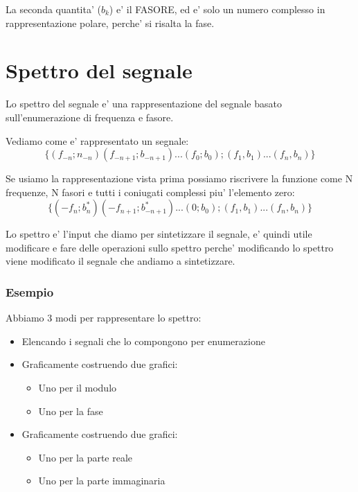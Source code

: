 La seconda quantita' ($b_k$) e' il FASORE, ed e' solo un numero complesso in rappresentazione polare, perche' si risalta la fase.

\section{Spettro del segnale}
Lo spettro del segnale e' una rappresentazione del segnale basato sull'enumerazione di frequenza e fasore.

Vediamo come e' rappresentato un segnale:
\begin{equation}
    \{ (f_{-n}; n_{-n})(f_{-n+1}; b_{-n+1}) \mbox{...} (f_0; b_0); (f_1, b_1) \mbox{...} (f_n, b_n) \}
\end{equation}

Se usiamo la rappresentazione vista prima possiamo riscrivere la funzione come N frequenze, N fasori e tutti i coniugati complessi piu' l'elemento zero:
\begin{equation}
    \{ (-f_n; b_n^*)(-f_{n+1}; b^*_{-n+1}) \mbox{...} (0; b_0); (f_1, b_1) \mbox{...} (f_n, b_n) \}
\end{equation}

Lo spettro e' l'input che diamo per sintetizzare il segnale, e' quindi utile modificare e fare delle operazioni sullo spettro perche' modificando lo spettro viene modificato il segnale che andiamo a sintetizzare.

\subsubsection{Esempio}
Abbiamo 3 modi per rappresentare lo spettro:
\begin{itemize}
    \item Elencando i segnali che lo compongono per enumerazione
    \item Graficamente costruendo due grafici:
    \begin{itemize}
        \item Uno per il modulo 
        \item Uno per la fase
    \end{itemize}
    \item Graficamente costruendo due grafici:
    \begin{itemize}
        \item Uno per la parte reale
        \item Uno per la parte immaginaria
    \end{itemize}
\end{itemize}


